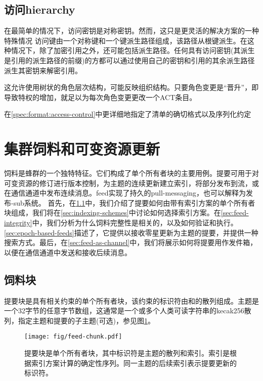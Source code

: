 \subsection{访问hierarchy\statusgreen}

在最简单的情况下，访问密钥是对称密钥。然而，这只是更灵活的解决方案的一种特殊情况
访问键由一个对称键和一个键派生路径组成，该路径从根键派生。在这种情况下，除了加密引用之外，还可能包括派生路径。任何具有访问密钥(其派生是引用的派生路径的前缀)的方都可以通过使用自己的密钥和引用的其余派生路径派生其密钥来解密引用。

这允许使用树状的角色层次结构，可能反映组织结构。只要角色变更是“晋升”，即导致特权的增加，就足以为每次角色变更更改一个ACT条目。

在\ref{spec:format:access-control}中更详细地指定了清单的确切格式以及序列化约定



\section{集群饲料和可变资源更新\statusyellow}\label{sec:feeds}

\green{}

饲料是蜂群的一个独特特征。它们构成了单个所有者块的主要用例。提要可用于对可变资源的修订进行版本控制，为主题的连续更新建立索引，将部分发布到流，或在通信通道中发布连续消息。feed实现了持久的pull-messaging，也可以解释为发布-sub系统。
首先，在\ref{sec:feed-chunks}中，我们介绍了提要如何由带有索引方案的单个所有者块组成，我们将在\ref{sec:indexing-schemes}中讨论如何选择索引方案。在\ref{sec:feed-integrity}中，我们分析为什么饲料完整性是相关的，以及如何验证和执行。\ref{sec:epoch-based-feeds}描述了，它提供以接收零星更新为主题的提要，并提供一种搜索方式。最后，在\ref{sec:feed-as-channel}中，我们将展示如何将提要用作发件箱，以便在通信通道中发送和接收后续消息。


\subsection{饲料块\statusyellow}\label{sec:feed-chunks}

提要块是具有相关约束的单个所有者块，该约束的标识符由和的散列组成。主题是一个32字节的任意字节数组，这通常是一个或多个人类可读字符串的kecak256散列，指定主题和提要的子主题(可选)，参见图\ref{fig:feed-chunk}。 


\begin{figure}[htbp]
\centering
\texttt{[image: fig/feed-chunk.pdf]}
\caption[饲料块\statusgreen]{提要块是单个所有者块，其中标识符是主题的散列和索引。索引是根据索引方案计算的确定性序列。同一主题的后续索引表示提要更新的标识符。}
\label{fig:feed-chunk}
\end{figure}

